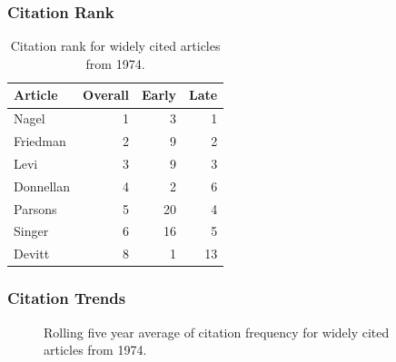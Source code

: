 \documentclass[
  10pt,
  letterpaper,
  DIV=11,
  numbers=noendperiod,
  twoside]{scrartcl}
\begin{document}
\subsubsection*{Citation Rank}\label{sec-rank-1974}

\begin{longtable}[]{@{}lrrr@{}}

\caption{\label{tbl-citation-rank-1974}Citation rank for widely cited
articles from 1974.}

\tabularnewline

\toprule\noalign{}
Article & Overall & Early & Late \\
\midrule\noalign{}
\endhead
\bottomrule\noalign{}
\endlastfoot
Nagel & 1 & 3 & 1 \\
Friedman & 2 & 9 & 2 \\
Levi & 3 & 9 & 3 \\
Donnellan & 4 & 2 & 6 \\
Parsons & 5 & 20 & 4 \\
Singer & 6 & 16 & 5 \\
Devitt & 8 & 1 & 13 \\

\end{longtable}

\subsubsection*{Citation Trends}\label{sec-trends-1974}

\begin{figure}


\caption{\label{fig-citation-spaghetti-1974}Rolling five year average of
citation frequency for widely cited articles from 1974.}

\end{figure}%
\end{document}
